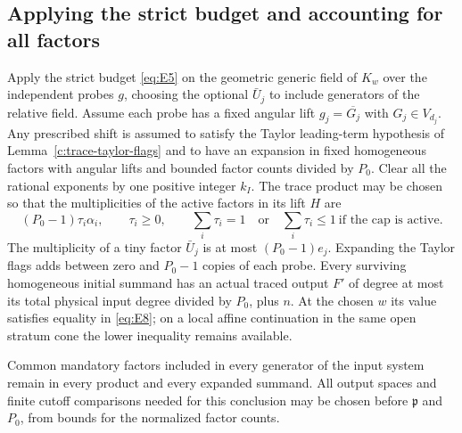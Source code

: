 \subsection{Applying the strict budget and accounting for all factors}

\begin{proposition}\label{c:trace-budget}
Apply the strict budget \eqref{eq:E5} on the geometric generic field of
$K_w$ over the independent probes $g$, choosing the optional $\bar U_j$
to include generators of the relative field.  Assume each probe has a fixed
angular lift $g_j=\overline{G_j}$ with $G_j\in V_{d_j}$.  Any prescribed
shift is assumed to satisfy the Taylor leading-term hypothesis of
Lemma~\ref{c:trace-taylor-flags} and to have an expansion in fixed homogeneous
factors with angular lifts and bounded factor counts divided by $P_0$.
Clear all the rational exponents
by one positive integer $k_I$.  The trace product may be chosen so that
the multiplicities of the active factors in its lift $H$ are
\begin{equation}\label{eq:E10}
 (P_0-1)\tau_i\alpha_i,\qquad
 \tau_i\ge0,\qquad
 \sum_i\tau_i=1
 \quad\text{or}\quad \sum_i\tau_i\le1\ \text{if the cap is active}.
\end{equation}
The multiplicity of a tiny factor $\bar U_j$ is at most
$(P_0-1)e_j$.  Expanding the Taylor flags adds between zero and $P_0-1$
copies of each probe.  Every surviving homogeneous initial summand has
an actual traced output $F'$ of degree at most its total physical input
degree divided by $P_0$, plus $n$.  At the chosen $w$ its value satisfies
equality in \eqref{eq:E8}; on a local affine continuation in the same
open stratum cone the lower inequality remains available.

Common mandatory factors included in every generator of the input
system remain in every product and every expanded summand.  All output
spaces and finite cutoff comparisons needed for this conclusion may be
chosen before $\mathfrak p$ and $P_0$, from bounds for the normalized factor counts.
\end{proposition}

